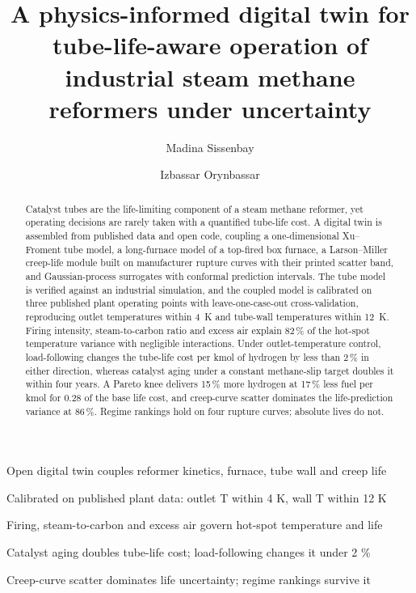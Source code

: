 \documentclass[final,3p,times]{elsarticle}
\begin{document}
\begin{frontmatter}

\title{A physics-informed digital twin for tube-life-aware operation of industrial steam methane reformers under uncertainty}

\author[au]{Madina Sissenbay}
\author[su]{Izbassar Orynbassar}

\begin{abstract}
Catalyst tubes are the life-limiting component of a steam methane reformer, yet operating decisions are rarely taken with a quantified tube-life cost. A digital twin is assembled from published data and open code, coupling a one-dimensional Xu--Froment tube model, a long-furnace model of a top-fired box furnace, a Larson--Miller creep-life module built on manufacturer rupture curves with their printed scatter band, and Gaussian-process surrogates with conformal prediction intervals. The tube model is verified against an industrial simulation, and the coupled model is calibrated on three published plant operating points with leave-one-case-out cross-validation, reproducing outlet temperatures within 4~K and tube-wall temperatures within 12~K. Firing intensity, steam-to-carbon ratio and excess air explain 82\,\% of the hot-spot temperature variance with negligible interactions. Under outlet-temperature control, load-following changes the tube-life cost per kmol of hydrogen by less than 2\,\% in either direction, whereas catalyst aging under a constant methane-slip target doubles it within four years. A Pareto knee delivers 15\,\% more hydrogen at 17\,\% less fuel per kmol for 0.28 of the base life cost, and creep-curve scatter dominates the life-prediction variance at 86\,\%. Regime rankings hold on four rupture curves; absolute lives do not.
\end{abstract}

\begin{highlights}
\item Open digital twin couples reformer kinetics, furnace, tube wall and creep life
\item Calibrated on published plant data: outlet T within 4 K, wall T within 12 K
\item Firing, steam-to-carbon and excess air govern hot-spot temperature and life
\item Catalyst aging doubles tube-life cost; load-following changes it under 2 \%
\item Creep-curve scatter dominates life uncertainty; regime rankings survive it
\end{highlights}


\end{frontmatter}
\end{document}
